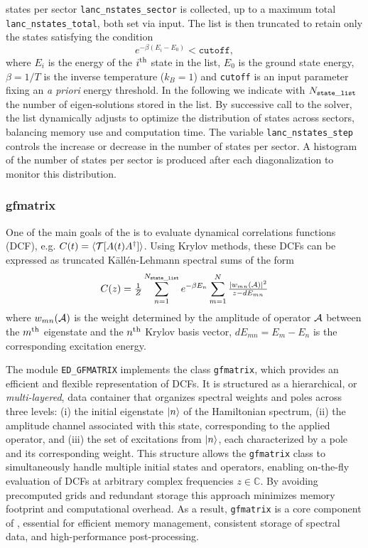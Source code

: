\documentclass[edipack_sp.tex]{subfiles}
\begin{document}
states per sector  
\texttt{lanc\_nstates\_sector} is collected, up to a
maximum total \texttt{lanc\_nstates\_total}, both set via input.  
The list is then truncated to retain only the states satisfying the condition 
$$
e^{-\beta(E_i-E_0)} < \mathtt{cutoff}, 
$$
where
$E_i$ is the energy of the $i^{\rm th}$ state in the list, $E_0$ is the
ground state energy, $\beta=1/T$ is the inverse temperature ($k_B=1$) and \texttt{cutoff} is an input parameter fixing an {\it a priori} energy threshold.
In the following we indicate with $N_{\tt state\_list}$ the number of eigen-solutions stored in the list. 
By successive call to the \NAME solver, the list dynamically adjusts to optimize the distribution of states 
across sectors, balancing memory use and computation time. The
variable \texttt{lanc\_nstates\_step} controls the increase or
decrease in the number of states per sector. 
A histogram  of the number of states per sector is produced after each diagonalization to monitor this distribution.



\subsubsection{gfmatrix}
One of the main goals of the \NAME is to evaluate dynamical correlations
functions (DCF), e.g. $C(t) = \ibra \TT[ A(t) A^\dagger ]\iket$. Using Krylov methods,
these DCFs can be expressed as truncated K\"all\'en-Lehmann spectral sums of the form
$$
C(z) = \tfrac{1}{Z}\sum_{n=1}^{N_{\tt state\_list}} e^{-\beta E_n} \sum_{m=1}^{N} \tfrac{|w_{mn}(\AA)|^2}{ z
  - dE_{mn}}
$$
where $w_{mn}(\AA)$ is the weight determined by the amplitude of operator $\AA$ between the
$m^{\rm th}$ eigenstate and the $n^{\rm th}$ Krylov basis vector, 
$dE_{mn}=E_m-E_n$ is the corresponding excitation energy.


The module {\tt ED\_GFMATRIX} implements the class {\tt gfmatrix}, which provides an efficient and flexible representation of DCFs. It is structured as a hierarchical, or {\it multi-layered}, data container that organizes spectral weights and poles across three levels: (i) the initial eigenstate $\ket{n}$ of the Hamiltonian spectrum, (ii) the amplitude channel associated with this state, corresponding to the applied operator, and (iii) the set of excitations from $\ket{n}$, each characterized by a pole and its corresponding weight.
This structure allows the {\tt gfmatrix} class to simultaneously handle multiple initial states and operators, enabling on-the-fly evaluation of DCFs at arbitrary complex frequencies $z \in \mathbb{C}$. By avoiding precomputed grids and redundant storage this approach minimizes memory footprint and computational overhead. As a result, {\tt gfmatrix} is a core component of \NAME, essential for efficient memory management, consistent storage of spectral data, and high-performance post-processing.
\end{document}
